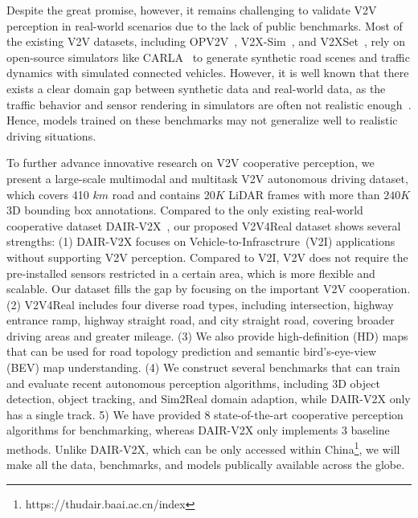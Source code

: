 \documentclass[10pt,twocolumn,letterpaper]{article}
\begin{document}
Despite the great promise, however, it remains challenging to validate V2V perception in real-world scenarios due to the lack of public benchmarks.
Most of the existing V2V datasets, including OPV2V~\cite{xu2022opv2v}, V2X-Sim~\cite{li2022v2x}, and V2XSet~\cite{xu2022v2xvit}, rely on open-source simulators like CARLA~\cite{dosovitskiy2017carla} to generate synthetic road scenes and traffic dynamics with simulated connected vehicles. However, it is well known that there exists a clear domain gap between synthetic data and real-world data, as the traffic behavior and sensor rendering in simulators are often not realistic enough~\cite{suo2021trafficsim,manivasagam2020lidarsim}. Hence, models trained on these benchmarks may not generalize well to realistic driving situations.

To further advance innovative research on V2V cooperative perception, we present a large-scale multimodal and multitask V2V autonomous driving dataset, which covers  410 $km$ road and contains $20K$ LiDAR frames with more than $240K$ 3D bounding box annotations.
Compared to the only existing real-world cooperative dataset DAIR-V2X~\cite{yu2022dair}, our proposed V2V4Real dataset shows several strengths: (1) DAIR-V2X focuses on Vehicle-to-Infrasctrure~(V2I) applications without supporting V2V perception. Compared to V2I, V2V does not require the pre-installed sensors restricted in a certain area, which is more flexible and scalable. Our dataset fills the gap by focusing on the important V2V cooperation. (2) V2V4Real includes four diverse road types, including intersection, highway entrance ramp, highway straight road, and city straight road, covering broader driving areas and greater mileage. (3) We also provide high-definition (HD) maps that can be used for road topology prediction and semantic bird's-eye-view (BEV) map understanding. (4) We construct several benchmarks that can train and evaluate recent autonomous perception algorithms, including 3D object detection, object tracking, and Sim2Real domain adaption, while DAIR-V2X only has a single track. 5) We have provided 8 state-of-the-art cooperative perception algorithms for benchmarking, whereas DAIR-V2X only implements 3 baseline methods. Unlike DAIR-V2X, which can be only accessed within China\footnote{https://thudair.baai.ac.cn/index}, we will make all the data, benchmarks, and models publically available across the globe. 
\end{document}
